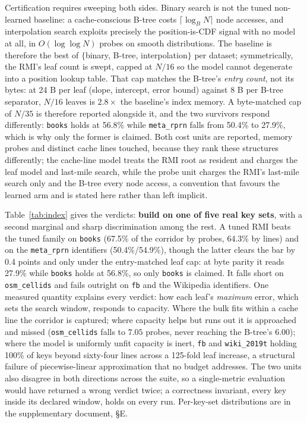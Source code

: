 \documentclass[letterpaper]{article} %
\begin{document}
Certification requires sweeping both sides. Binary search is not the tuned non-learned baseline: a cache-conscious B-tree \citep{ccbtree} costs $\lceil\log_{B} N\rceil$ node accesses, and interpolation search \citep{interp} exploits precisely the position-is-CDF signal with no model at all, in $O(\log\log N)$ probes on smooth distributions. The baseline is therefore the best of $\{$binary, B-tree, interpolation$\}$ per dataset; symmetrically, the RMI's leaf count is swept, capped at $N/16$ so the model cannot degenerate into a position lookup table. That cap matches the B-tree's \emph{entry count}, not its bytes: at 24 B per leaf (slope, intercept, error bound) against 8 B per B-tree separator, $N/16$ leaves is $2.8\times$ the baseline's index memory. A byte-matched cap of $N/35$ is therefore reported alongside it, and the two survivors respond differently: \texttt{books} holds at 56.8\% while \texttt{meta\_rprn} falls from 50.4\% to 27.9\%, which is why only the former is claimed. Both cost units are reported, memory probes and distinct cache lines touched, because they rank these structures differently; the cache-line model treats the RMI root as resident and charges the leaf model and last-mile search, while the probe unit charges the RMI's last-mile search only and the B-tree every node access, a convention that favours the learned arm and is stated here rather than left implicit.

Table~\ref{tab:index} gives the verdicts: \textbf{build on one of five real key sets}, with a second marginal and sharp discrimination among the rest. A tuned RMI beats the tuned family on \texttt{books} (67.5\% of the corridor by probes, 64.3\% by lines) and on the \texttt{meta\_rprn} identifiers (50.4\%/54.9\%), though the latter clears the bar by 0.4 points and only under the entry-matched leaf cap: at byte parity it reads 27.9\% while \texttt{books} holds at 56.8\%, so only \texttt{books} is claimed. It falls short on \texttt{osm\_cellids} and fails outright on \texttt{fb} and the Wikipedia identifiers. One measured quantity explains every verdict: how each leaf's \emph{maximum} error, which sets the search window, responds to capacity. Where the bulk fits within a cache line the corridor is captured; where capacity helps but runs out it is approached and missed (\texttt{osm\_cellids} falls to $7.05$ probes, never reaching the B-tree's $6.00$); where the model is uniformly unfit capacity is inert, \texttt{fb} and \texttt{wiki\_2019t} holding 100\% of keys beyond sixty-four lines across a 125-fold leaf increase, a structural failure of piecewise-linear approximation that no budget addresses. The two units also disagree in both directions across the suite, so a single-metric evaluation would have returned a wrong verdict twice; a correctness invariant, every key inside its declared window, holds on every run. Per-key-set distributions are in the supplementary document, \S E.
\end{document}
